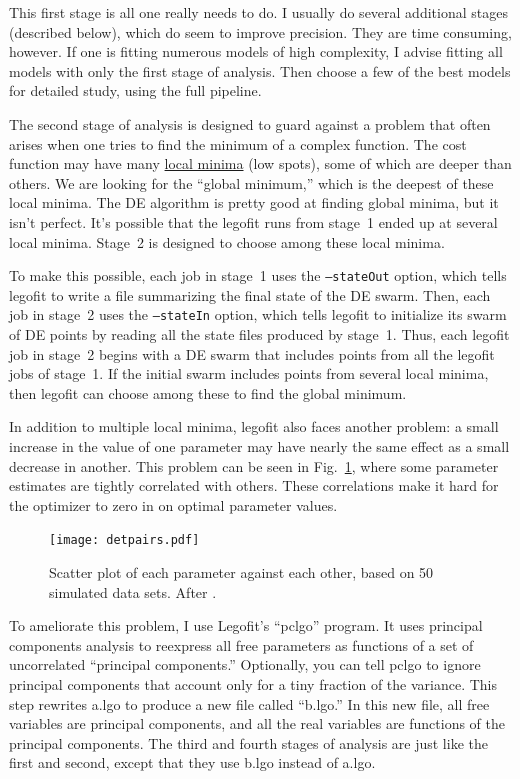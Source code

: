 \documentclass[11pt]{article}
\begin{document}
This first stage is all one really needs to do. I usually do several
additional stages (described below), which do seem to improve
precision. They are time consuming, however. If one is fitting
numerous models of high complexity, I advise fitting all models with
only the first stage of analysis. Then choose a few of the best models
for detailed study, using the full pipeline.

The second stage of analysis is designed to guard against a problem
that often arises when one tries to find the minimum of a complex
function. The cost function may have many
\href{https://en.wikipedia.org/wiki/Maxima_and_minima}{local minima}
(low spots), some of which are deeper than others. We are looking for
the ``global minimum,'' which is the deepest of these local
minima. The DE algorithm is pretty good at finding global minima, but
it isn't perfect. It's possible that the legofit runs from stage~1
ended up at several local minima. Stage~2 is designed to choose among
these local minima.

To make this possible, each job in stage~1 uses the
\texttt{--stateOut} option, which tells legofit to write a file
summarizing the final state of the DE swarm. Then, each job in
stage~2 uses the \texttt{--stateIn} option, which tells legofit to
initialize its swarm of DE points by reading all the state files
produced by stage~1. Thus, each legofit job in stage~2 begins with a
DE swarm that includes points from all the legofit jobs of stage~1. If
the initial swarm includes points from several local minima, then
legofit can choose among these to find the global minimum.

In addition to multiple local minima, legofit also faces another
problem: a small increase in the value of one parameter may have
nearly the same effect as a small decrease in another. This problem
can be seen in Fig.~\ref{fig.pairs}, where some parameter estimates
are tightly correlated with others. These correlations make it hard
for the optimizer to zero in on optimal parameter values.

\begin{figure}
  {\centering
    \texttt{[image: detpairs.pdf]}\\}
  \caption{Scatter plot of each parameter against each other, based on
    50 simulated data sets. After \citet[Fig.~3]{Rogers:PCJ-2-e32}.}
  \label{fig.pairs}
\end{figure}

To ameliorate this problem, I use Legofit's ``pclgo'' program. It uses
principal components analysis to reexpress all free parameters as
functions of a set of uncorrelated ``principal components.''
Optionally, you can tell pclgo to ignore principal components that
account only for a tiny fraction of the variance. This step rewrites
a.lgo to produce a new file called ``b.lgo.'' In this new file, all
free variables are principal components, and all the real variables
are functions of the principal components.  The third and fourth
stages of analysis are just like the first and second, except that they
use b.lgo instead of a.lgo.
\end{document}
